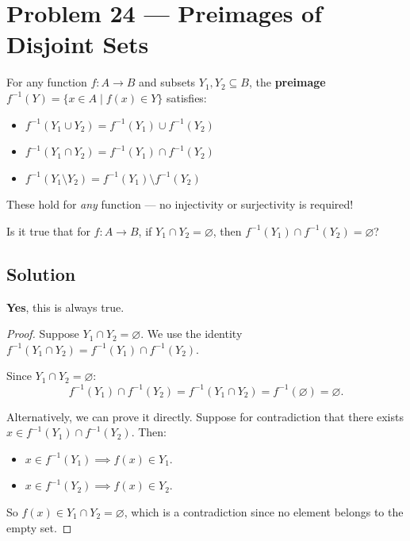 \documentclass[12pt, a4paper]{article}
\begin{document}
\section{Problem 24 --- Preimages of Disjoint Sets}

\begin{theorybox}
For any function $f : A \to B$ and subsets $Y_1, Y_2 \subseteq B$, the \textbf{preimage}
$f^{-1}(Y) = \{x \in A \mid f(x) \in Y\}$ satisfies:
\begin{itemize}[nosep]
  \item $f^{-1}(Y_1 \cup Y_2) = f^{-1}(Y_1) \cup f^{-1}(Y_2)$
  \item $f^{-1}(Y_1 \cap Y_2) = f^{-1}(Y_1) \cap f^{-1}(Y_2)$
  \item $f^{-1}(Y_1 \setminus Y_2) = f^{-1}(Y_1) \setminus f^{-1}(Y_2)$
\end{itemize}
These hold for \emph{any} function --- no injectivity or surjectivity is required!
\end{theorybox}

\begin{problembox}
Is it true that for $f : A \to B$, if $Y_1 \cap Y_2 = \varnothing$, then
$f^{-1}(Y_1) \cap f^{-1}(Y_2) = \varnothing$?
\end{problembox}

\subsection*{Solution}

\textbf{Yes}, this is always true.

\begin{proof}
Suppose $Y_1 \cap Y_2 = \varnothing$. We use the identity $f^{-1}(Y_1 \cap Y_2) = f^{-1}(Y_1) \cap f^{-1}(Y_2)$.

Since $Y_1 \cap Y_2 = \varnothing$:
\[
  f^{-1}(Y_1) \cap f^{-1}(Y_2) = f^{-1}(Y_1 \cap Y_2) = f^{-1}(\varnothing) = \varnothing.
\]

Alternatively, we can prove it directly. Suppose for contradiction that there exists
$x \in f^{-1}(Y_1) \cap f^{-1}(Y_2)$. Then:
\begin{itemize}[nosep]
  \item $x \in f^{-1}(Y_1) \implies f(x) \in Y_1$.
  \item $x \in f^{-1}(Y_2) \implies f(x) \in Y_2$.
\end{itemize}
So $f(x) \in Y_1 \cap Y_2 = \varnothing$, which is a contradiction since no element belongs to the empty set.
\end{proof}
\end{document}
